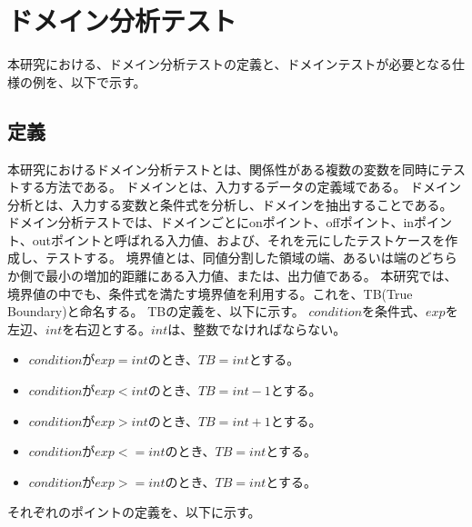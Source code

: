 \documentclass[uplatex, report, a4j, 10pt]{jsbook}
\begin{document}
\section{ドメイン分析テスト}\label{cha:domain}
本研究における、ドメイン分析テストの定義と、ドメインテストが必要となる仕様の例を、以下で示す。

\subsection{定義}\label{sec:define}
本研究におけるドメイン分析テストとは、関係性がある複数の変数を同時にテストする方法である\cite{izon}\cite{istqb}。
ドメインとは、入力するデータの定義域である。
ドメイン分析とは、入力する変数と条件式を分析し、ドメインを抽出することである。
ドメイン分析テストでは、ドメインごとにonポイント、offポイント、inポイント、outポイントと呼ばれる入力値、および、それを元にしたテストケースを作成し、テストする。
境界値とは、同値分割した領域の端、あるいは端のどちらか側で最小の増加的距離にある入力値、または、出力値である\cite{istqb}。
本研究では、境界値の中でも、条件式を満たす境界値を利用する。これを、TB(True Boundary)と命名する。
TBの定義を、以下に示す。
$condition$を条件式、$exp$を左辺、$int$を右辺とする。$int$は、整数でなければならない。
\begin{itemize}
  \item $condition$が$exp = int$のとき、$TB = int$とする。
  \item $condition$が$exp < int$のとき、$TB = int - 1$とする。
  \item $condition$が$exp > int$のとき、$TB = int + 1$とする。
  \item $condition$が$exp <= int$のとき、$TB = int$とする。
  \item $condition$が$exp >= int$のとき、$TB = int$とする。
\end{itemize}
それぞれのポイントの定義を、以下に示す。
\end{document}
